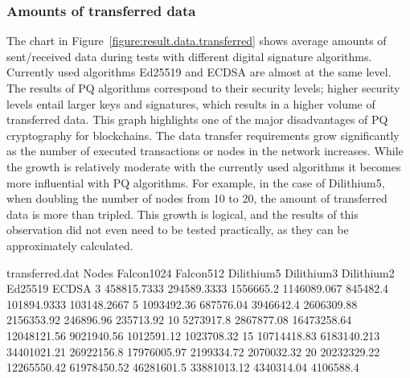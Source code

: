 
\subsubsection{Amounts of transferred data}

The chart in Figure~\ref{figure:result.data.transferred} shows average amounts of sent/received data during tests with different digital signature algorithms. Currently used algorithms Ed25519 and ECDSA are almost at the same level. The results of PQ algorithms correspond to their security levels; higher security levels entail larger keys and signatures, which results in a higher volume of transferred data. This graph highlights one of the major disadvantages of PQ cryptography for blockchains. The data transfer requirements grow significantly as the number of executed transactions or nodes in the network increases. While the growth is relatively moderate with the currently used algorithms it becomes more influential with PQ algorithms. For example, in the case of Dilithium5, when doubling the number of nodes from 10 to 20, the amount of transferred data is more than tripled. This growth is logical, and the results of this observation did not even need to be tested practically, as they can be approximately calculated.

\begin{filecontents}{transferred.dat}
Nodes	Falcon1024	Falcon512	Dilithium5	Dilithium3	Dilithium2	Ed25519	ECDSA
3	458815.7333	294589.3333	1556665.2	1146089.067	845482.4	101894.9333	103148.2667
5	1093492.36	687576.04	3946642.4	2606309.88	2156353.92	246896.96	235713.92
10	5273917.8	2867877.08	16473258.64	12048121.56	9021940.56	1012591.12	1023708.32
15	10714418.83	6183140.213	34401021.21	26922156.8	17976005.97	2199334.72	2070032.32
20	20232329.22	12265550.42	61978450.52	46281601.5	33881013.12	4340314.04	4106588.4
\end{filecontents}

